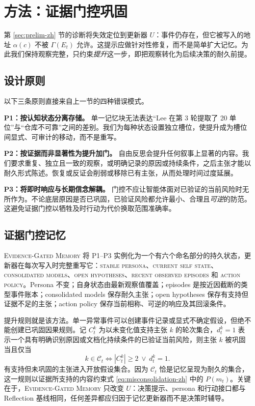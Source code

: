 \documentclass[UTF8,11pt]{ctexart}
\newcommand{\egm}{\textsc{Evidence-Gated Memory}}
\begin{document}
\section{方法：证据门控巩固}\label{sec:method-zh}

第 \ref{sec:prelim-zh} 节的诊断将失效定位到更新器 $U$：事件仍存在，但它被写入的地址 $\alpha(c)$ 不被 $\Gamma(E_t)$ 允许。这提示应做针对性修复，而不是简单扩大记忆。为此我们保持观察完整，只约束\emph{提升}这一步，即把观察转化为后续决策的耐久前提。

\subsection{设计原则}

以下三条原则直接来自上一节的四种错误模式。

\noindent\textbf{P1：按认知状态分离存储。} 单一记忆块无法表达“Lee 在第 3 轮提取了 20 单位”与“仓库不可靠”之间的差别。我们为每种状态设置独立槽位，使提升成为槽位间显式、可审计的移动，而不是重写。

\noindent\textbf{P2：按证据而非显著性为提升加门。} 自由反思会提升任何叙事上显著的内容。我们要求重复、独立且一致的观察，或明确记录的原因或持续条件，之后主张才能以耐久形式陈述。恢复或反证会削弱或移除已有主张，从而处理时间过度延展。

\noindent\textbf{P3：将即时响应与长期信念解耦。} 门控不应让智能体面对已验证的当前风险时无所作为。不论底层原因是否已巩固，已验证风险都允许最小、合理且\emph{可逆}的防范。这避免证据门控以牺牲及时行动为代价换取范围准确率。

\subsection{证据门控记忆}

\egm{} 将 P1--P3 实例化为一个有六个命名部分的持久状态，更新器在每次写入时完整重写它：\textsc{stable persona}、\textsc{current self state}、\textsc{consolidated models}、\textsc{open hypotheses}、\textsc{recent observed episodes} 和 \textsc{action policy}。Persona 不变；自身状态由最新观察值覆盖；episodes 是按近因截断的类型事件账本；consolidated models 保存耐久主张；open hypotheses 保存有支持但证据不足的主张；action policy 保存当前相称、可逆的响应及其回滚条件。

提升规则就是该方法。单一异常事件可以创建事件记录或显式不确定假设，但绝不能创建已巩固因果规则。记 $C_t^k$ 为以未变化值支持主张 $k$ 的轮次集合，$d_t^k=1$ 表示一个具有明确识别原因或文档化持续条件的已验证当前风险，则主张 $k$ 被巩固当且仅当
\begin{equation}
k\in\mathcal{C}_t\iff |C_t^k|\ge 2\ \lor\ d_t^k=1.\label{eq:consolidation-zh}
\end{equation}
有支持但未巩固的主张进入开放假设集合。因为 $\mathcal{C}_t$ 恰是记忆呈现为耐久的集合，这一规则以证据所支持的内容约束式 \ref{eq:misconsolidation-zh} 中的 $P(m_t)$。关键在于，\egm{} 只改变 $U$：决策提示、persona 和行动接口都与 Reflection 基线相同，任何差异都应归因于记忆更新器而不是决策时辅导。
\end{document}
